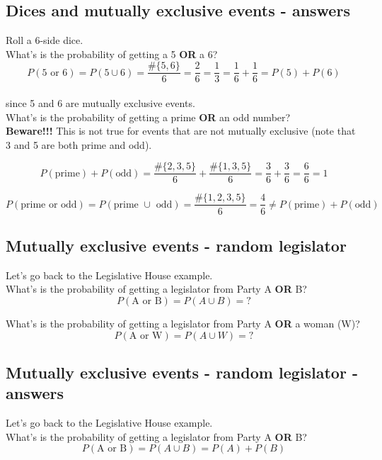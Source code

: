 \documentclass[11pt]{article}
\begin{document}
	\subsection{Dices and mutually exclusive events - answers}

	Roll a 6-side dice.\\
	
	What's is the probability of getting a 5 \textbf{OR} a 6?\\
	\[P(\text{5 or 6}) = P(5 \cup 6) = \frac{\#\{5, 6\}}{6} = \frac{2}{6} = \frac{1}{3} = \frac{1}{6} + \frac{1}{6} = P(5) + P(6)\]\\ 
	since 5 and 6 are mutually exclusive events.\\
	
	What's is the probability of getting a prime \textbf{OR} an odd number?\\

	\textbf{Beware!!!} This is not true for events that are not mutually exclusive (note that 3 and 5 are both prime and odd).

	\[P(\text{prime}) + P(\text{odd}) = \frac{\#\{2, 3, 5\}}{6} + \frac{\#\{1, 3, 5\}}{6} = \frac{3}{6} + \frac{3}{6} = \frac{6}{6} = 1\]
	
	\[P(\text{prime or odd}) = P(\text{prime }\cup\text{ odd}) = \frac{\#\{1, 2, 3, 5\}}{6} = \frac{4}{6} \neq P(\text{prime}) + P(\text{odd})\]


	\subsection{Mutually exclusive events - random legislator}

	Let's go back to the Legislative House example.\\
	
	What's is the probability of getting a legislator from Party A \textbf{OR} B?
	\[P(\text{A or B}) = P(A \cup B) = ?\]
	
	What's is the probability of getting a legislator from Party A \textbf{OR} a woman (W)?
	\[P(\text{A or W}) = P(A \cup W) =?\]


	\subsection{Mutually exclusive events - random legislator - answers}
	
	Let's go back to the Legislative House example.\\
	
	What's is the probability of getting a legislator from Party A \textbf{OR} B?
	\[P(\text{A or B}) = P(A \cup B) = P(A) + P(B)\]
	
\end{document}
